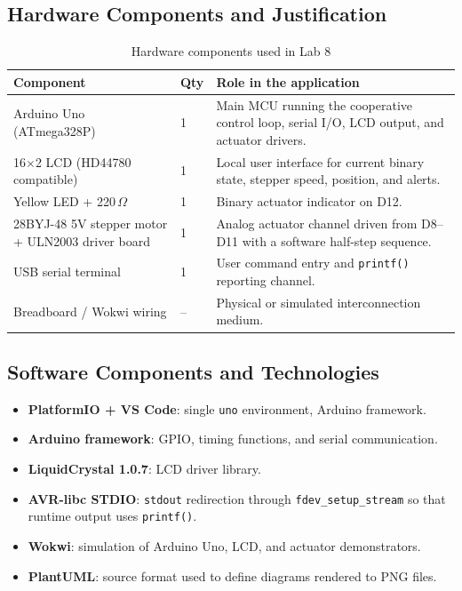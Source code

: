 \documentclass[12pt]{article}
\begin{document}
\subsection{Hardware Components and Justification}

\begin{table}[H]
\centering
\begin{tabular}{p{4.4cm} p{1.5cm} p{7.1cm}}
\toprule
\textbf{Component} & \textbf{Qty} & \textbf{Role in the application} \\
\midrule
Arduino Uno (ATmega328P) & 1 & Main MCU running the cooperative control loop, serial I/O, LCD output, and actuator drivers. \\
16$\times$2 LCD (HD44780 compatible) & 1 & Local user interface for current binary state, stepper speed, position, and alerts. \\
Yellow LED + 220\,$\Omega$ & 1 & Binary actuator indicator on D12. \\
28BYJ-48 5V stepper motor + ULN2003 driver board & 1 & Analog actuator channel driven from D8--D11 with a software half-step sequence. \\
USB serial terminal & 1 & User command entry and \texttt{printf()} reporting channel. \\
Breadboard / Wokwi wiring & -- & Physical or simulated interconnection medium. \\
\bottomrule
\end{tabular}
\caption{Hardware components used in Lab 8}
\label{tab:hardware}
\end{table}

\subsection{Software Components and Technologies}
\begin{itemize}
    \item \textbf{PlatformIO + VS Code}: single \texttt{uno} environment, Arduino framework.
    \item \textbf{Arduino framework}: GPIO, timing functions, and serial communication.
    \item \textbf{LiquidCrystal 1.0.7}: LCD driver library.
    \item \textbf{AVR-libc STDIO}: \texttt{stdout} redirection through \texttt{fdev\_setup\_stream} so that runtime output uses \texttt{printf()}. 
    \item \textbf{Wokwi}: simulation of Arduino Uno, LCD, and actuator demonstrators.
    \item \textbf{PlantUML}: source format used to define diagrams rendered to PNG files.
\end{itemize}
\end{document}
